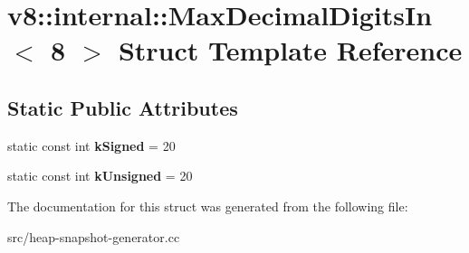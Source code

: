 \hypertarget{structv8_1_1internal_1_1_max_decimal_digits_in_3_018_01_4}{}\section{v8\+:\+:internal\+:\+:Max\+Decimal\+Digits\+In$<$ 8 $>$ Struct Template Reference}
\label{structv8_1_1internal_1_1_max_decimal_digits_in_3_018_01_4}
\subsection*{Static Public Attributes}
\begin{DoxyCompactItemize}
\item 
\hypertarget{structv8_1_1internal_1_1_max_decimal_digits_in_3_018_01_4_a5d49496214ab42e45bffd9981e9aab1b}{}static const int {\bfseries k\+Signed} = 20\label{structv8_1_1internal_1_1_max_decimal_digits_in_3_018_01_4_a5d49496214ab42e45bffd9981e9aab1b}

\item 
\hypertarget{structv8_1_1internal_1_1_max_decimal_digits_in_3_018_01_4_a638181a897d317a42625ed1dfcba1090}{}static const int {\bfseries k\+Unsigned} = 20\label{structv8_1_1internal_1_1_max_decimal_digits_in_3_018_01_4_a638181a897d317a42625ed1dfcba1090}

\end{DoxyCompactItemize}


The documentation for this struct was generated from the following file\+:\begin{DoxyCompactItemize}
\item 
src/heap-\/snapshot-\/generator.\+cc\end{DoxyCompactItemize}
